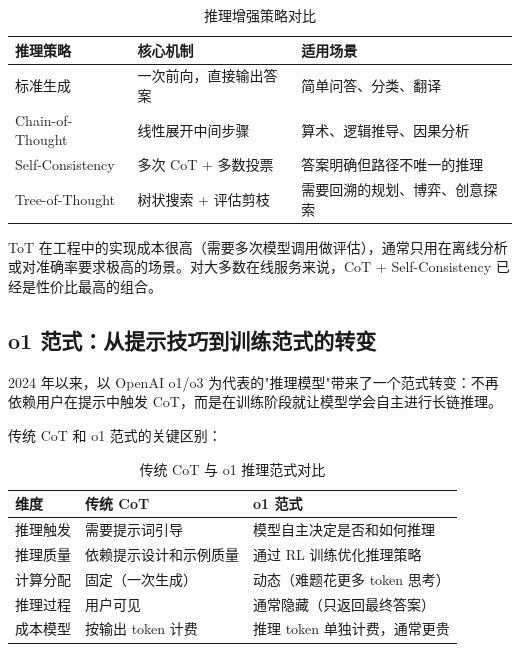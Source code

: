 \begin{table}[H]
\centering
\small
\begin{tabularx}{\textwidth}{>{\raggedright\arraybackslash}p{2.8cm}>{\raggedright\arraybackslash}p{3.5cm}>{\raggedright\arraybackslash}X}
\toprule
\textbf{推理策略} & \textbf{核心机制} & \textbf{适用场景} \\
\midrule
标准生成 & 一次前向，直接输出答案 & 简单问答、分类、翻译 \\
Chain-of-Thought & 线性展开中间步骤 & 算术、逻辑推导、因果分析 \\
Self-Consistency & 多次 CoT + 多数投票 & 答案明确但路径不唯一的推理 \\
Tree-of-Thought & 树状搜索 + 评估剪枝 & 需要回溯的规划、博弈、创意探索 \\
\bottomrule
\end{tabularx}
\caption{推理增强策略对比}
\label{tab:reasoning-strategies}
\end{table}

ToT 在工程中的实现成本很高（需要多次模型调用做评估），通常只用在离线分析或对准确率要求极高的场景。对大多数在线服务来说，CoT + Self-Consistency 已经是性价比最高的组合。

\subsection{o1 范式：从提示技巧到训练范式的转变}
2024 年以来，以 OpenAI o1/o3 为代表的"推理模型"带来了一个范式转变：不再依赖用户在提示中触发 CoT，而是在训练阶段就让模型学会自主进行长链推理。

传统 CoT 和 o1 范式的关键区别：

\begin{table}[H]
\centering
\small
\begin{tabularx}{\textwidth}{>{\raggedright\arraybackslash}p{3cm}>{\raggedright\arraybackslash}p{4.5cm}>{\raggedright\arraybackslash}X}
\toprule
\textbf{维度} & \textbf{传统 CoT} & \textbf{o1 范式} \\
\midrule
推理触发 & 需要提示词引导 & 模型自主决定是否和如何推理 \\
推理质量 & 依赖提示设计和示例质量 & 通过 RL 训练优化推理策略 \\
计算分配 & 固定（一次生成） & 动态（难题花更多 token 思考） \\
推理过程 & 用户可见 & 通常隐藏（只返回最终答案） \\
成本模型 & 按输出 token 计费 & 推理 token 单独计费，通常更贵 \\
\bottomrule
\end{tabularx}
\caption{传统 CoT 与 o1 推理范式对比}
\label{tab:cot-vs-o1}
\end{table}

